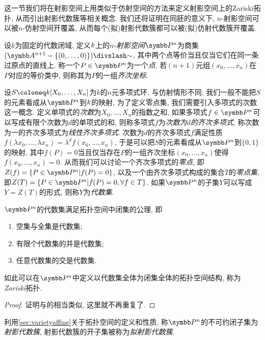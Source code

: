 这一节我们将在射影空间上用类似于仿射空间的方法来定义射影空间上的Zariski拓扑, 从而引出射影代数簇等相关概念. 我们还将证明在同胚的意义下, $n$-射影空间可以被$n$-仿射空间开覆盖, 从而每个(拟)射影代数簇都可以被(拟)仿射代数簇开覆盖.

设$k$为固定的代数闭域, 定义$k$上的$n$-\emph{射影空间}$\PP^n$为商集$(\AF^{n+1}-\{(0, \dotsc, 0)\}){\divslash}{\sim}$, 其中两个点等价当且仅当它们在同一条过原点的直线上. 称一个$P\in\PP^n$为一个\emph{点}, 若$(n+1)$元组$(x_0, \dotsc, x_n)$在$P$对应的等价类中, 则称其为$P$的一组\emph{齐次坐标}.

设$S\coloneq \kk [X_0, \dotsc, X_n]$为$k$的$n$元多项式环, 与仿射情形不同, 我们一般不能把$S$的元素看成从$\PP^n$到$k$的映射, 为了定义零点集, 我们需要引入多项式的次数这一概念. 定义单项式的\emph{次数}为$X_0, \dotsc, X_n$的指数之和, 如果多项式$f\in \PP^n$可以写成有限个次数为$d$的单项式的和, 则称多项式$f$为\emph{次数为$d$的齐次多项式}, 称次数为一的齐次多项式为\emph{线性齐次多项式}. 次数为$d$的齐次多项式$f$满足性质$f(\lambda x_0, \dotsc, \lambda x_n)=\lambda^d f(x_0, \dotsc, x_n)$, 于是可以把$S$的元素看成从$\PP^n$到$\{0, 1\}$的映射, 其中$f(P)=0$当且仅当存在$P$的一组齐次坐标$(x_0, \dotsc, x_n)$使得$f(x_0, \dotsc, x_n)=0$. 从而我们可以讨论一个齐次多项式的\emph{零点}, 即$Z(f)=\{P\in \PP^n\vert f(P)=0\}$, 以及一个由齐次多项式构成的集合$T$的\emph{零点集}, 即$Z(T)=\{P\in\PP^n\vert f(P)=0, \forall f\in T\}$. 如果$\PP^n$的子集$Y$可以写成$Y=Z(T)$的形式, 则称$Y$为\emph{代数集}.

\begin{proposition}
    $\PP^n$的代数集满足拓扑空间中闭集的公理, 即
    \begin{enumerate}
        \item 空集与全集是代数集;
        \item 有限个代数集的并是代数集;
        \item 任意代数集的交是代数集.
    \end{enumerate}
    如此可以在$\PP^n$中定义以代数集全体为闭集全体的拓扑空间结构, 称为\emph{Zariski}拓扑.
\end{proposition}

\begin{proof}
    证明与的相当类似, 这里就不再重复了.
\end{proof}

利用\ref{sec:varietyaffine}关于拓扑空间的定义和性质, 称$\PP^n$的不可约闭子集为\emph{射影代数簇}, 射影代数簇的开子集被称为\emph{拟射影代数簇}.


